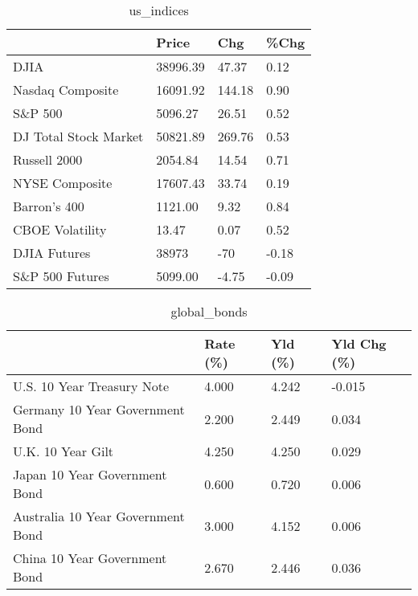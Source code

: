 \documentclass{article}%
\begin{document}
%


\begin{table}[htbp]%
\caption{us\_indices}%
\centering%
\begin{adjustbox}{width=1\textwidth}%
\begin{tabular}{llll}
\toprule
                      &    Price &    Chg &  \%Chg \\
\midrule
                 DJIA & 38996.39 &  47.37 &  0.12 \\
     Nasdaq Composite & 16091.92 & 144.18 &  0.90 \\
              S\&P 500 &  5096.27 &  26.51 &  0.52 \\
DJ Total Stock Market & 50821.89 & 269.76 &  0.53 \\
         Russell 2000 &  2054.84 &  14.54 &  0.71 \\
       NYSE Composite & 17607.43 &  33.74 &  0.19 \\
         Barron's 400 &  1121.00 &   9.32 &  0.84 \\
      CBOE Volatility &    13.47 &   0.07 &  0.52 \\
         DJIA Futures &    38973 &    -70 & -0.18 \\
      S\&P 500 Futures &  5099.00 &  -4.75 & -0.09 \\
\bottomrule
\end{tabular}
%
\end{adjustbox}%
\end{table}

%


\begin{table}[htbp]%
\caption{global\_bonds}%
\centering%
\begin{adjustbox}{width=1\textwidth}%
\begin{tabular}{llll}
\toprule
                                  & Rate (\%) & Yld (\%) & Yld Chg (\%) \\
\midrule
       U.S. 10 Year Treasury Note &    4.000 &   4.242 &      -0.015 \\
  Germany 10 Year Government Bond &    2.200 &   2.449 &       0.034 \\
                U.K. 10 Year Gilt &    4.250 &   4.250 &       0.029 \\
    Japan 10 Year Government Bond &    0.600 &   0.720 &       0.006 \\
Australia 10 Year Government Bond &    3.000 &   4.152 &       0.006 \\
    China 10 Year Government Bond &    2.670 &   2.446 &       0.036 \\
\bottomrule
\end{tabular}
%
\end{adjustbox}%
\end{table}
\end{document}
